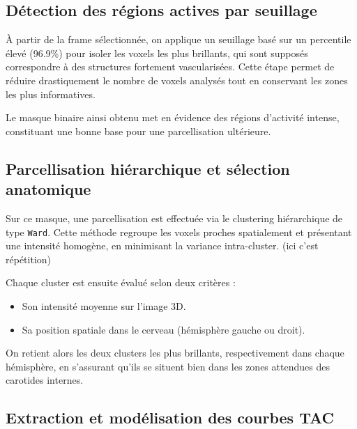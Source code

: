 \documentclass[a4paper]{article}
\begin{document}
    \vspace{0.5em}
    \subsection*{Détection des régions actives par seuillage}
        
        \noindent
        À partir de la frame sélectionnée, on applique un seuillage basé sur un percentile élevé (96.9\%) pour isoler les voxels les plus brillants, qui sont supposés correspondre à des structures fortement vascularisées. Cette étape permet de réduire drastiquement le nombre de voxels analysés tout en conservant les zones les plus informatives.
        
        \noindent
        Le masque binaire ainsi obtenu met en évidence des régions d’activité intense, constituant une bonne base pour une parcellisation ultérieure.
        
        \vspace{0.5em}
        \subsection*{Parcellisation hiérarchique et sélection anatomique}
        
        \noindent
        Sur ce masque, une parcellisation est effectuée via le clustering hiérarchique de type \texttt{Ward}. Cette méthode regroupe les voxels proches spatialement et présentant une intensité homogène, en minimisant la variance intra-cluster. (ici c'est répétition)
        
        \noindent
        Chaque cluster est ensuite évalué selon deux critères :
        \begin{itemize}
            \item Son intensité moyenne sur l’image 3D.
            \item Sa position spatiale dans le cerveau (hémisphère gauche ou droit).
        \end{itemize}
        
        \noindent
        On retient alors les deux clusters les plus brillants, respectivement dans chaque hémisphère, en s’assurant qu’ils se situent bien dans les zones attendues des carotides internes.
        
        \vspace{0.5em}
    \subsection*{Extraction et modélisation des courbes TAC}
        
\end{document}
